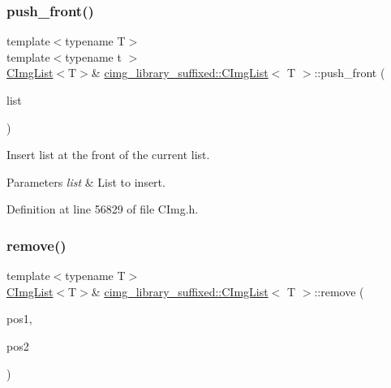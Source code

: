 \subsubsection{\texorpdfstring{push\+\_\+front()}{push\_front()}\hspace{0.1cm}{\footnotesize\ttfamily [2/2]}}
{\footnotesize\ttfamily template$<$typename T$>$ \\
template$<$typename t $>$ \\
\hyperlink{structcimg__library__suffixed_1_1CImgList}{C\+Img\+List}$<$T$>$\& \hyperlink{structcimg__library__suffixed_1_1CImgList}{cimg\+\_\+library\+\_\+suffixed\+::\+C\+Img\+List}$<$ T $>$\+::push\+\_\+front (\begin{DoxyParamCaption}\item[{const \hyperlink{structcimg__library__suffixed_1_1CImgList}{C\+Img\+List}$<$ t $>$ \&}]{list }\end{DoxyParamCaption})\hspace{0.3cm}{\ttfamily [inline]}}



Insert list at the front of the current list. 


\begin{DoxyParams}{Parameters}
{\em list} & List to insert. \\
\hline
\end{DoxyParams}


Definition at line 56829 of file C\+Img.\+h.

\mbox{\label{structcimg__library__suffixed_1_1CImgList_a5ba43383fa88dd0cbd26db1511280cc5}} 
\subsubsection{\texorpdfstring{remove()}{remove()}\hspace{0.1cm}{\footnotesize\ttfamily [1/2]}}
{\footnotesize\ttfamily template$<$typename T$>$ \\
\hyperlink{structcimg__library__suffixed_1_1CImgList}{C\+Img\+List}$<$T$>$\& \hyperlink{structcimg__library__suffixed_1_1CImgList}{cimg\+\_\+library\+\_\+suffixed\+::\+C\+Img\+List}$<$ T $>$\+::remove (\begin{DoxyParamCaption}\item[{const unsigned int}]{pos1,  }\item[{const unsigned int}]{pos2 }\end{DoxyParamCaption})\hspace{0.3cm}{\ttfamily [inline]}}



